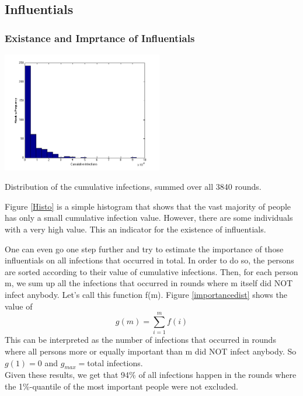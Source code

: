 \subsection{Influentials}

\subsubsection{Existance and Imprtance of Influentials}

\begin{minipage}{0.5\textwidth}
\includegraphics[width=7cm]{influ2}
\caption{Distribution of the cumulative infections, summed over all 3840 rounds. \newline}
\label{Histo}
\end{minipage}
\begin{minipage}{0.5\textwidth}
Figure \ref{Histo} is a simple histogram that shows that the vast majority of people has only a small cumulative infection value. However, there are some individuals with a very high value. This an indicator for the existence of influentials.   \\
\end{minipage}




\noindent One can even go one step further and try to estimate the importance of those influentials on all infections that occurred in total. In order to do so, the persons are sorted according to their value of cumulative infections. Then, for each person m, we sum up all the infections that occurred in rounds where m itself did NOT infect anybody. Let's call this function f(m). Figure \ref{importancedist} shows the value of $$g(m)=\sum_{i=1}^m f(i) $$
This can be interpreted as the number of infections that occurred in rounds where all persons more or equally important than m did NOT infect anybody. So $g(1)=0$ and $g_{max}=$total infections.
\\
Given these results, we get that 94\% of all infections happen in the rounds where the 1\%-quantile of the most important people were not excluded. 


